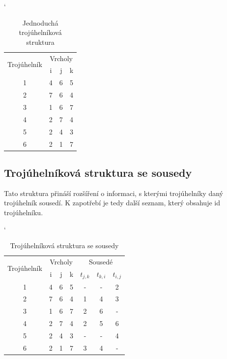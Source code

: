 \documentclass[12pt,a4paper]{article}
\begin{document}
\begin{table}[h]
\catcode`
\begin{tabular}{|c||c|c|c|}
\hline
\multirow{2}{*}{Trojúhelník} & \multicolumn{3}{c|}{Vrcholy} \\ \cline{2-4} 
                             & i        & j       & k       \\ \hline \hline
1                            & 4        & 6       & 5       \\ \hline
2                            & 7        & 6       & 4       \\ \hline
3                            & 1        & 6       & 7       \\ \hline
4                            & 2        & 7       & 4       \\ \hline
5                            & 2        & 4       & 3       \\ \hline
6                            & 2        & 1       & 7       \\ \hline
\end{tabular}
\caption{Jednoduchá trojúhelníková struktura}
\label{tab:troj_struktura_simple}
\end{table}



\subsection{Trojúhelníková struktura se sousedy}

Tato struktura přináší rozšíření o informaci, s kterými trojúhelníky daný trojúhelník sousedí. K zapotřebí je tedy další seznam, který obsahuje id trojúhelníku.

\begin{table}[h]
\catcode`
\begin{tabular}{|c||c|c|c||c|c|c|}
\hline
\multirow{2}{*}{Trojúhelník} & \multicolumn{3}{|c|}{Vrcholy} & \multicolumn{3}{|c|}{Sousedé}      \\ \cline{2-7} 
                             & i        & j       & k       & $t_{j,k}$ & $t_{k,i}$ & $t_{i,j}$ \\ \hline \hline
1                            & 4        & 6       & 5       & -         & -         & 2         \\ \hline
2                            & 7        & 6       & 4       & 1         & 4         & 3         \\ \hline
3                            & 1        & 6       & 7       & 2         & 6         & -         \\ \hline
4                            & 2        & 7       & 4       & 2         & 5         & 6         \\ \hline
5                            & 2        & 4       & 3       & -         & -         & 4         \\ \hline
6                            & 2        & 1       & 7       & 3         & 4         & -         \\ \hline
\end{tabular}
\caption{Trojúhelníková struktura se sousedy}
\label{tab:troj_strukt_sous}
\end{table}
\end{document}
